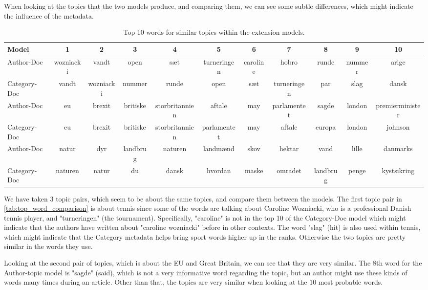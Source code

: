 When looking at the topics that the two models produce, and comparing them, we can see some subtle differences, which might indicate the influence of the metadata.
\begin{table}
		\centering
	\caption{Top 10 words for similar topics within the extension models.}
	\begin{tabular}{l|c|c|c|c|c|c|c|c|c|c}
		Model & 1 & 2 & 3 & 4 & 5 & 6 & 7 & 8 & 9 & 10 \\
		\midrule
		Author-Doc & wozniacki & vandt & open & sæt & turneringen & caroline & hobro & runde & nummer & arige \\
		Category-Doc & vandt & wozniacki & nummer & runde & open & sæt & turneringen & par & slag & dansk \\
		\midrule
		Author-Doc & eu & brexit & britiske & storbritannien & aftale & may & parlamentet & sagde & london & premierminister \\
		Category-Doc & eu & brexit & britiske & storbritannien & parlamentet & may & aftale & europa & london & johnson \\
		\midrule
		Author-Doc & natur & dyr & landbrug & naturen & landmænd & skov & hektar & vand & lille & danmarks \\
		Category-Doc & naturen & natur & du & dansk & hvordan & maske & omradet & landbrug & penge & kystsikring \\
	\end{tabular}
	\label{tab:top_word_comparison}
\end{table}
We have taken 3 topic pairs, which seem to be about the same topics, and compare them between the models.
The first topic pair in \autoref{tab:top_word_comparison} is about tennis since some of the words are talking about Caroline Wozniacki, who is a professional Danish tennis player, and "turneringen" (the tournament).
Specifically, "caroline" is not in the top 10 of the Category-Doc model which might indicate that the authors have written about "caroline wozniacki" before in other contexts.
The word "slag" (hit) is also used within tennis, which might indicate that the Category metadata helps bring sport words higher up in the ranks.
Otherwise the two topics are pretty similar in the words they use.

Looking at the second pair of topics, which is about the EU and Great Britain, we can see that they are very similar.
The 8th word for the Author-topic model is "sagde" (said), which is not a very informative word regarding the topic, but an author might use these kinds of words many times during an article.
Other than that, the topics are very similar when looking at the 10 most probable words.

